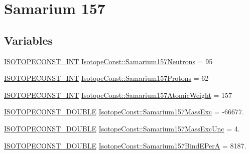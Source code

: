 \hypertarget{group___isotope_const-_samarium-_sm157}{}\section{Samarium 157}
\label{group___isotope_const-_samarium-_sm157}
\subsection*{Variables}
\begin{DoxyCompactItemize}
\item 
\mbox{\hyperlink{group___isotope_const-_macros_ga5f18360b3e99483a35c32d789e62621c}{I\+S\+O\+T\+O\+P\+E\+C\+O\+N\+S\+T\+\_\+\+I\+NT}} \mbox{\hyperlink{group___isotope_const-_samarium-_sm157_ga842dc24de24182f62022c2d7a04b6f9d}{Isotope\+Const\+::\+Samarium157\+Neutrons}} = 95
\item 
\mbox{\hyperlink{group___isotope_const-_macros_ga5f18360b3e99483a35c32d789e62621c}{I\+S\+O\+T\+O\+P\+E\+C\+O\+N\+S\+T\+\_\+\+I\+NT}} \mbox{\hyperlink{group___isotope_const-_samarium-_sm157_ga107644ebd6011560b7737e4b2193993a}{Isotope\+Const\+::\+Samarium157\+Protons}} = 62
\item 
\mbox{\hyperlink{group___isotope_const-_macros_ga5f18360b3e99483a35c32d789e62621c}{I\+S\+O\+T\+O\+P\+E\+C\+O\+N\+S\+T\+\_\+\+I\+NT}} \mbox{\hyperlink{group___isotope_const-_samarium-_sm157_gab70cb9ecb9ad62efec9f7c77de754778}{Isotope\+Const\+::\+Samarium157\+Atomic\+Weight}} = 157
\item 
\mbox{\hyperlink{group___isotope_const-_macros_ga8f45a7272ce02c0b4c65c44636ed719a}{I\+S\+O\+T\+O\+P\+E\+C\+O\+N\+S\+T\+\_\+\+D\+O\+U\+B\+LE}} \mbox{\hyperlink{group___isotope_const-_samarium-_sm157_ga8955bacf527e2087f804efcf77ee4a95}{Isotope\+Const\+::\+Samarium157\+Mass\+Exc}} = -\/66677.
\item 
\mbox{\hyperlink{group___isotope_const-_macros_ga8f45a7272ce02c0b4c65c44636ed719a}{I\+S\+O\+T\+O\+P\+E\+C\+O\+N\+S\+T\+\_\+\+D\+O\+U\+B\+LE}} \mbox{\hyperlink{group___isotope_const-_samarium-_sm157_ga2e28ad9908af180350e21cb2b9119fd9}{Isotope\+Const\+::\+Samarium157\+Mass\+Exc\+Unc}} = 4.
\item 
\mbox{\hyperlink{group___isotope_const-_macros_ga8f45a7272ce02c0b4c65c44636ed719a}{I\+S\+O\+T\+O\+P\+E\+C\+O\+N\+S\+T\+\_\+\+D\+O\+U\+B\+LE}} \mbox{\hyperlink{group___isotope_const-_samarium-_sm157_ga40bf9ec4aa24276c632ea70b331dbd27}{Isotope\+Const\+::\+Samarium157\+Bind\+E\+PerA}} = 8187.
\item 

\end{DoxyCompactItemize}
